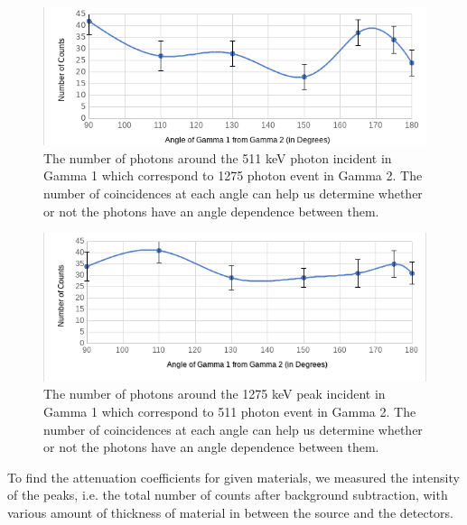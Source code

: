 \documentclass[10pt]{IEEEtran}
\begin{document}
    \begin{figure}[!hbtp]
			\includegraphics[width=\linewidth]{511-1275}
			\caption{The number of photons around the 511 keV photon incident in Gamma 1 which correspond to 1275 photon event in Gamma 2.  The number of coincidences at each angle can help us determine whether or not the photons have an angle dependence between them.}
			\label{fig:511-1275}
    \end{figure}     
    \begin{figure}[!hbtp]
			\includegraphics[width=\linewidth]{1275-511}
			\caption{The number of photons around the 1275 keV peak incident in Gamma 1 which correspond to 511 photon event in Gamma 2. The number of coincidences at each angle can help us determine whether or not the photons have an angle dependence between them.}
			\label{fig:1275-511}    
    \end{figure} 

To find the attenuation coefficients for given materials, we measured the intensity of the peaks, i.e. the total number of counts after background subtraction, with various amount of thickness of material in between the source and the detectors.       
\end{document}
